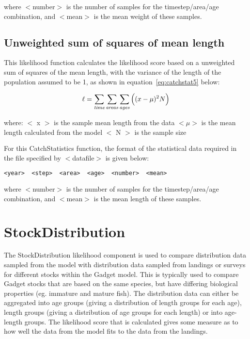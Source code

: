 \documentclass [a4paper, 10pt]{book}
\begin{document}
where $<$number$>$ is the number of samples for the timestep/area/age combination, and $<$mean$>$ is the mean weight of these samples.

\subsection{Unweighted sum of squares of mean length}
This likelihood function calculates the likelihood score based on a unweighted sum of squares of the mean length, with the variance of the length of the population assumed to be 1, as shown in equation~\ref{eq:catchstat5} below:

\begin{equation}\label{eq:catchstat5}
\ell = \sum_{\it time}\sum_{\it areas}\sum_{\it ages} \Big((x-\mu)^2 N\Big)
\end{equation}

where:\newline
$<$ x $>$ is the sample mean length from the data\newline
$<\mu>$ is the mean length calculated from the model\newline
$<$ N $>$ is the sample size

\bigskip
For this CatchStatistics function, the format of the statistical data required in the file specified by $<$datafile$>$ is given below:

{\small\begin{verbatim}
<year>  <step>  <area>  <age>  <number>  <mean>
\end{verbatim}}

where $<$number$>$ is the number of samples for the timestep/area/age combination, and $<$mean$>$ is the mean length of these samples.

\section{StockDistribution}\label{sec:stockdist}
The StockDistribution likelihood component is used to compare distribution data sampled from the model with distribution data sampled from landings or surveys for different stocks within the Gadget model.  This is typically used to compare Gadget stocks that are based on the same species, but have differing biological properties (eg. immature and mature fish).  The distribution data can either be aggregated into age groups (giving a distribution of length groups for each age), length groups (giving a distribution of age groups for each length) or into age-length groups.  The likelihood score that is calculated gives some measure as to how well the data from the model fits to the data from the landings.
\end{document}
